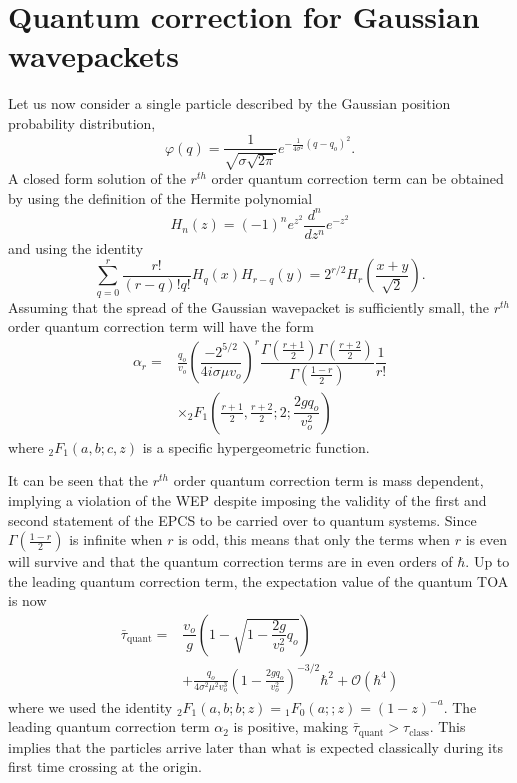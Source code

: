 \documentclass[%
 reprint,
 amsmath,amssymb,
 aps,
]{revtex4-1}
\begin{document}
\section{Quantum correction for Gaussian wavepackets}
\label{sec:quant_corr}
Let us now consider a single particle described by the Gaussian position probability distribution,
\begin{equation}
\varphi(q) = \dfrac{1}{\sqrt{\sigma \sqrt{2 \pi}}} e^{-\frac{1}{4\sigma^2}(q-q_o)^2}.
\label{gaussianwavefunction}
\end{equation}
A closed form solution of the $r^{th}$ order quantum correction term can be obtained by using the definition of the Hermite polynomial
\begin{equation}
H_n(z) = (-1)^n e^{z^2}\frac{d^n}{dz^n}e^{-z^2}
\end{equation}
and using the identity \cite{hermite}
\begin{equation}
\sum_{q=0}^{r}\dfrac{r!}{(r-q)!q!}H_q(x)H_{r-q}(y)=2^{r/2}H_r\left(\dfrac{x+y}{\sqrt{2}}\right).
\end{equation}
Assuming that the spread of the Gaussian wavepacket is sufficiently small, the $r^{th}$ order quantum correction term will have the form      
\begin{align}
\alpha_{r} =& \frac{q_o}{v_o} \left(\dfrac{-2^{5/2}}{4i\sigma \mu v_o}\right)^r \dfrac{\Gamma(\frac{r+1}{2})\Gamma(\frac{r+2}{2})}{\Gamma(\frac{1-r}{2})} \dfrac{1}{r!} \nonumber \\
& \times{_2 F_1}\left(\frac{r+1}{2}, \frac{r+2}{2};2;\dfrac{2 g q_o}{v_o^2}\right)
\label{qcorr}
\end{align}
where ${_2F_1}(a,b;c,z)$ is a specific hypergeometric function.

It can be seen that the $r^{th}$ order quantum correction term is mass dependent, implying a violation of the WEP despite imposing the validity of the first and second statement of the EPCS to be carried over to quantum systems. Since $\Gamma(\frac{1-r}{2})$ is infinite when $r$ is odd, this means that only the terms when $r$ is even will survive and that the quantum correction terms are in even orders of $\hbar$. Up to the leading quantum correction term, the expectation value of the quantum TOA is now 
\begin{align}
\bar{\tau}_{\text{quant}}=&\dfrac{v_o}{g} \left(1 - \sqrt{1-\dfrac{2 g}{v_o^2}q_o} \right) \nonumber \\
& + \frac{q_o}{4 \sigma ^2 \mu ^2 v_o^3}\left(1-\frac{2 g q_o}{v_o^2}\right)^{-3/2}\hbar^{2} + \mathcal{O}(\hbar^4)
\label{expansionconfirm}
\end{align}
where we used the identity ${_2F_1}(a,b;b;z)={_1F_0}(a;;z)=(1-z)^{-a}$. 
The leading quantum correction term $\alpha_2$ is positive, making $\bar{\tau}_{\text{quant}} > \tau_{\text{class}}$. This implies that the particles arrive later than what is expected classically during its first time crossing at the origin. 
\end{document}
